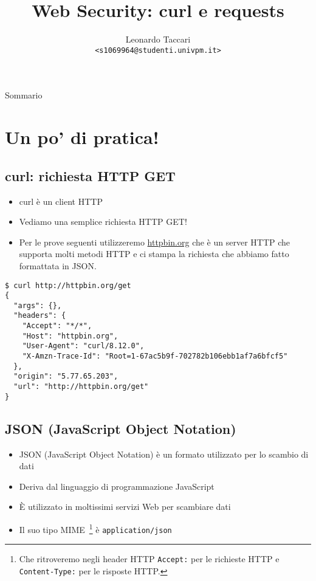 \documentclass{beamer}
\title{Web Security: curl e requests}
\author[leot]{Leonardo Taccari \\ {\footnotesize \texttt{<s1069964@studenti.univpm.it>}}}
\date{}
\newcommand{\code}[1]{\mbox{\texttt{#1}}}
\begin{document}
\begin{frame}
\maketitle
\end{frame}

\begin{frame}{Sommario}
\tableofcontents
\end{frame}

\section{Un po' di pratica!}
\subsection*{curl: richiesta HTTP GET}
\begin{frame}[fragile]{\insertsection}{\insertsubsection}
\begin{itemize}
\item \alert{curl} è un client \alert{HTTP}
\item Vediamo una semplice richiesta HTTP GET!
\item Per le prove seguenti utilizzeremo \href{https://httpbin.org}{httpbin.org}
che è un server HTTP che supporta molti \alert{metodi HTTP} e ci stampa la
richiesta che abbiamo fatto formattata in JSON.
\end{itemize}
{\tiny
\begin{verbatim}
$ curl http://httpbin.org/get
{
  "args": {},
  "headers": {
    "Accept": "*/*",
    "Host": "httpbin.org",
    "User-Agent": "curl/8.12.0",
    "X-Amzn-Trace-Id": "Root=1-67ac5b9f-702782b106ebb1af7a6bfcf5"
  },
  "origin": "5.77.65.203",
  "url": "http://httpbin.org/get"
}
\end{verbatim}
}
\end{frame}

\subsection*{JSON (JavaScript Object Notation)}
\begin{frame}{\insertsection}{\insertsubsection}
\begin{itemize}
\item \alert{JSON (JavaScript Object Notation)} è un formato utilizzato per lo
scambio di dati
\item Deriva dal linguaggio di programmazione JavaScript
\item È utilizzato in moltissimi servizi Web per scambiare dati
\item Il suo tipo MIME~\footnote{Che ritroveremo negli header HTTP
\code{Accept:} per le richieste HTTP
e \code{Content-Type:} per le risposte HTTP.} è \code{application/json}
\end{itemize}
\end{frame}
\end{document}
